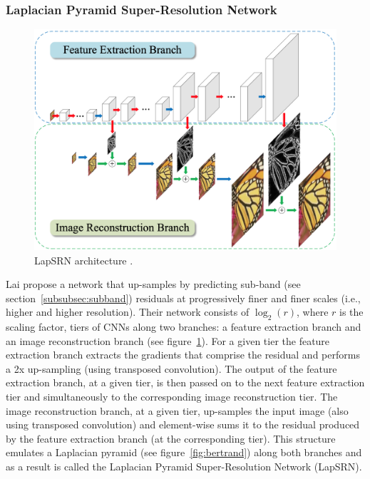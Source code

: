 \subsubsection{Laplacian Pyramid Super-Resolution Network}\label{subsubsec:lapsrn}
\begin{figure}
    \centering
    \begin{adjustbox}{width=\linewidth}
        \centering
        \includegraphics{figures/neural_networks/lapsrn.png}
    \end{adjustbox}
    \caption{LapSRN architecture \cite{Lai_2017}.}\label{fig:lapsrn}
\end{figure}
Lai \etal \cite{Lai_2017} propose a network that up-samples by predicting sub-band (see section~\ref{subsubsec:subband}) residuals at progressively finer and finer scales (i.e., higher and higher resolution).
%
Their network consists of \(\log_2(r)\), where \(r\) is the scaling factor, tiers of CNNs along two branches: a feature extraction branch and an image reconstruction branch (see figure~\ref{fig:lapsrn}).
%
For a given tier the feature extraction branch extracts the gradients that comprise the residual and performs a 2x up-sampling (using transposed convolution). 
%
The output of the feature extraction branch, at a given tier, is then passed on to the next feature extraction tier and simultaneously to the corresponding image reconstruction tier.
%
The image reconstruction branch, at a given tier, up-samples the input image (also using transposed convolution) and element-wise sums it to the residual produced by the feature extraction branch (at the corresponding tier).
%
This structure emulates a Laplacian pyramid (see figure~\ref{fig:bertrand}) along both branches and as a result is called the Laplacian Pyramid Super-Resolution Network (LapSRN).

